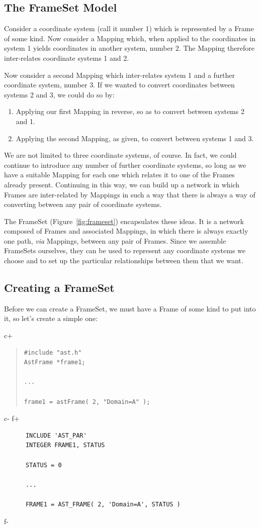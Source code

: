 \documentclass[twoside,11pt]{article}
\begin{document}
\subsection{The FrameSet Model}

Consider a coordinate system (call it number 1) which is represented
by a Frame of some kind. Now consider a Mapping which, when applied to
the coordinates in system 1 yields coordinates in another system,
number 2. The Mapping therefore inter-relates coordinate systems 1 and
2.

Now consider a second Mapping which inter-relates system 1 and a
further coordinate system, number 3. If we wanted to convert
coordinates between systems 2 and 3, we could do so by:

\begin{enumerate}
\item Applying our first Mapping in reverse, so as to convert between
systems 2 and 1.

\item Applying the second Mapping, as given, to convert between
systems 1 and 3.
\end{enumerate}

We are not limited to three coordinate systems, of course. In fact, we
could continue to introduce any number of further coordinate systems,
so long as we have a suitable Mapping for each one which relates it to
one of the Frames already present. Continuing in this way, we can
build up a network in which Frames are inter-related by Mappings in
such a way that there is always a way of converting between any pair
of coordinate systems.

The FrameSet (Figure~\ref{fig:frameset}) encapsulates these ideas.  It
is a network composed of Frames and associated Mappings, in which
there is always exactly one path, {\em{via}} Mappings, between any
pair of Frames.  Since we assemble FrameSets ourselves, they can be
used to represent any coordinate systems we choose and to set up the
particular relationships between them that we want.

\subsection{\label{ss:creatingaframeset}Creating a FrameSet}

Before we can create a FrameSet, we must have a Frame of some kind to
put into it, so let's create a simple one:

c+
\begin{quote}
\small
\begin{verbatim}
#include "ast.h"
AstFrame *frame1;

...

frame1 = astFrame( 2, "Domain=A" );
\end{verbatim}
\normalsize
\end{quote}
c-
f+
\small
\begin{verbatim}
      INCLUDE 'AST_PAR'
      INTEGER FRAME1, STATUS

      STATUS = 0

      ...

      FRAME1 = AST_FRAME( 2, 'Domain=A', STATUS )
\end{verbatim}
\normalsize
f-
\end{document}

